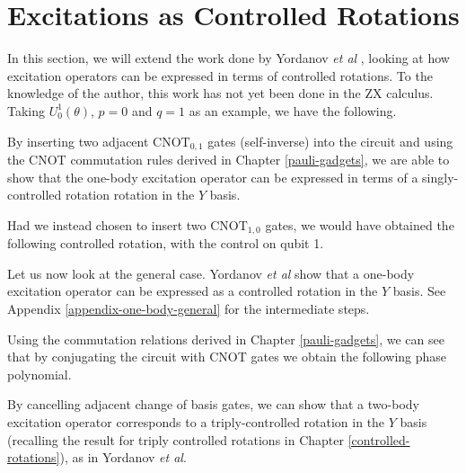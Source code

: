 \section{Excitations as Controlled Rotations}%
\label{operator-controlled-rotations}

In this section, we will extend the work done by Yordanov \textit{et al} \cite{Yordanov2020}, looking at how excitation operators can be expressed in terms of controlled rotations. To the knowledge of the author, this work has not yet been done in the ZX calculus. Taking $U^1_0(\theta)$, $p = 0$ and $q = 1$ as an example, we have the following.


By inserting two adjacent $\text{CNOT}_{0, 1}$ gates (self-inverse) into the circuit and using the CNOT commutation rules derived in Chapter \ref{pauli-gadgets}, we are able to show that the one-body excitation operator can be expressed in terms of a singly-controlled rotation rotation in the $Y$ basis.


Had we instead chosen to insert two $\text{CNOT}_{1, 0}$ gates, we would have obtained the following controlled rotation, with the control on qubit 1.


Let us now look at the general case. Yordanov \textit{et al} \cite{Yordanov2020} show that a one-body excitation operator can be expressed as a controlled rotation in the $Y$ basis. See Appendix \ref{appendix-one-body-general} for the intermediate steps.


Using the commutation relations derived in Chapter \ref{pauli-gadgets}, we can see that by conjugating the circuit with CNOT gates we obtain the following phase polynomial.


By cancelling adjacent change of basis gates, we can show that a two-body excitation operator corresponds to a triply-controlled rotation in the $Y$ basis (recalling the result for triply controlled rotations in Chapter \ref{controlled-rotations}), as in Yordanov \textit{et al}.

